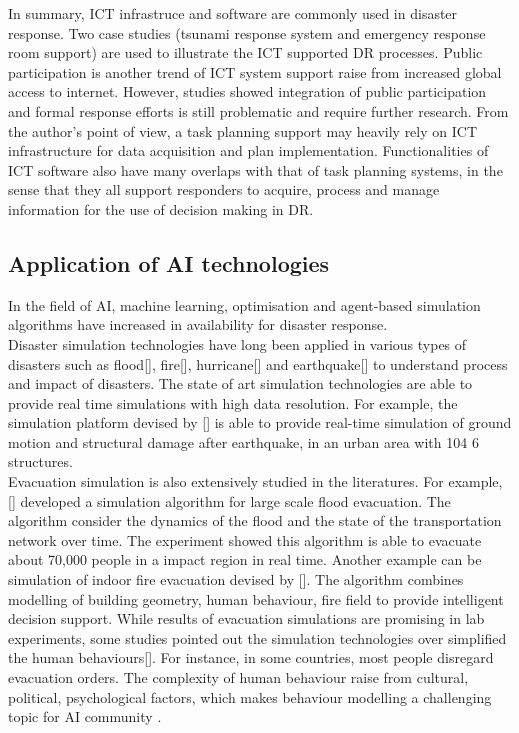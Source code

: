 In summary, ICT infrastruce and software are commonly used in disaster response. Two case studies (tsunami response system and emergency response room support) are used to illustrate the ICT supported DR processes. Public participation is another trend of ICT system support raise from increased global access to internet. However, studies showed integration of public participation and formal response efforts is still problematic and require further research. From the author's point of view, a task planning support may heavily rely on ICT infrastructure for data acquisition and plan implementation. Functionalities of ICT software also have many overlaps with that of task planning systems, in the sense that they all support responders to acquire, process and manage information for the use of decision making in DR. \\


\subsection{Application of AI technologies}\label{sec:lraisupport}
In the field of AI, machine learning, optimisation and agent-based simulation algorithms have increased in availability for disaster response. \\

Disaster simulation technologies \cite{Okaya,Scerri2005} have long been applied in various types of disasters such as flood[], fire[], hurricane[] and earthquake[] to understand process and impact of disasters. The state of art simulation technologies are able to provide real time simulations with high data resolution. For example, the simulation platform devised by [] is able to provide real-time simulation of ground motion and structural damage after earthquake, in an urban area with 104 6 structures. \\

Evacuation simulation is also extensively studied in the literatures. For example, [] developed a simulation algorithm for large scale flood evacuation. The algorithm consider the dynamics of the flood and the state of the transportation network over time. The experiment showed this algorithm is able to evacuate about 70,000 people in a impact region in real time.  Another example can be simulation of indoor fire evacuation devised by [].  The algorithm combines modelling of building geometry, human behaviour, fire field to provide intelligent decision support. While results of evacuation simulations are promising in lab experiments, some studies pointed out the simulation technologies over simplified the human behaviours[]. For instance, in some countries, most people disregard evacuation orders. The complexity of human behaviour raise from cultural, political, psychological factors, which makes behaviour modelling a challenging topic for AI community \cite{Provitolo2011} . \\

